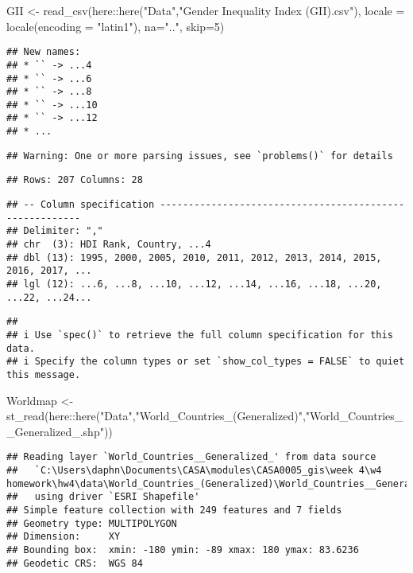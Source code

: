 \documentclass[
]{article}
\newenvironment{Shaded}{\begin{snugshade}}{\end{snugshade}}
\newcommand{\AttributeTok}[1]{\textcolor[rgb]{0.77,0.63,0.00}{#1}}
\newcommand{\DecValTok}[1]{\textcolor[rgb]{0.00,0.00,0.81}{#1}}
\newcommand{\FunctionTok}[1]{\textcolor[rgb]{0.00,0.00,0.00}{#1}}
\newcommand{\NormalTok}[1]{#1}
\newcommand{\OtherTok}[1]{\textcolor[rgb]{0.56,0.35,0.01}{#1}}
\newcommand{\SpecialCharTok}[1]{\textcolor[rgb]{0.00,0.00,0.00}{#1}}
\newcommand{\StringTok}[1]{\textcolor[rgb]{0.31,0.60,0.02}{#1}}
\begin{document}
\begin{Shaded}
\begin{Highlighting}[]
\NormalTok{GII }\OtherTok{\textless{}{-}} \FunctionTok{read\_csv}\NormalTok{(here}\SpecialCharTok{::}\FunctionTok{here}\NormalTok{(}\StringTok{"Data"}\NormalTok{,}\StringTok{"Gender Inequality Index (GII).csv"}\NormalTok{),}
                \AttributeTok{locale =} \FunctionTok{locale}\NormalTok{(}\AttributeTok{encoding =} \StringTok{"latin1"}\NormalTok{),}
                \AttributeTok{na=}\StringTok{".."}\NormalTok{,}
                \AttributeTok{skip=}\DecValTok{5}\NormalTok{)}
\end{Highlighting}
\end{Shaded}

\begin{verbatim}
## New names:
## * `` -> ...4
## * `` -> ...6
## * `` -> ...8
## * `` -> ...10
## * `` -> ...12
## * ...
\end{verbatim}

\begin{verbatim}
## Warning: One or more parsing issues, see `problems()` for details
\end{verbatim}

\begin{verbatim}
## Rows: 207 Columns: 28
\end{verbatim}

\begin{verbatim}
## -- Column specification --------------------------------------------------------
## Delimiter: ","
## chr  (3): HDI Rank, Country, ...4
## dbl (13): 1995, 2000, 2005, 2010, 2011, 2012, 2013, 2014, 2015, 2016, 2017, ...
## lgl (12): ...6, ...8, ...10, ...12, ...14, ...16, ...18, ...20, ...22, ...24...
\end{verbatim}

\begin{verbatim}
## 
## i Use `spec()` to retrieve the full column specification for this data.
## i Specify the column types or set `show_col_types = FALSE` to quiet this message.
\end{verbatim}

\begin{Shaded}
\begin{Highlighting}[]
\NormalTok{Worldmap }\OtherTok{\textless{}{-}} \FunctionTok{st\_read}\NormalTok{(here}\SpecialCharTok{::}\FunctionTok{here}\NormalTok{(}\StringTok{"Data"}\NormalTok{,}\StringTok{"World\_Countries\_(Generalized)"}\NormalTok{,}\StringTok{"World\_Countries\_\_Generalized\_.shp"}\NormalTok{))}
\end{Highlighting}
\end{Shaded}

\begin{verbatim}
## Reading layer `World_Countries__Generalized_' from data source 
##   `C:\Users\daphn\Documents\CASA\modules\CASA0005_gis\week 4\w4 homework\hw4\data\World_Countries_(Generalized)\World_Countries__Generalized_.shp' 
##   using driver `ESRI Shapefile'
## Simple feature collection with 249 features and 7 fields
## Geometry type: MULTIPOLYGON
## Dimension:     XY
## Bounding box:  xmin: -180 ymin: -89 xmax: 180 ymax: 83.6236
## Geodetic CRS:  WGS 84
\end{verbatim}
\end{document}
